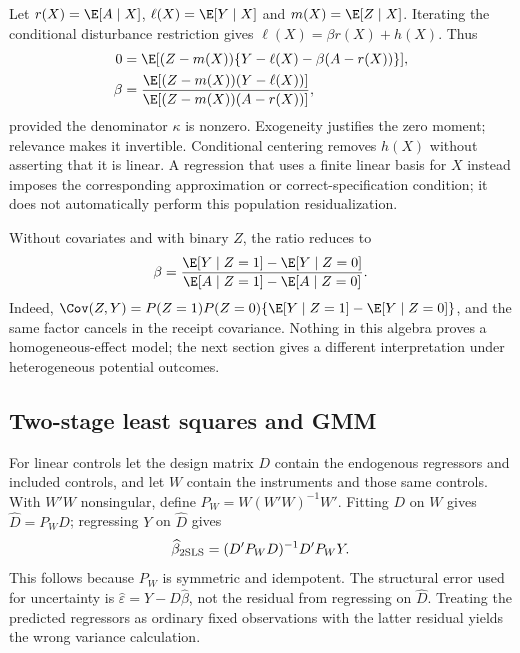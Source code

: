 Let $r(X)=\E[A\mid X]$, $\ell(X)=\E[Y\mid X]$ and
$m(X)=\E[Z\mid X]$. Iterating the conditional disturbance restriction
gives $\ell(X)=\beta r(X)+h(X)$. Thus
\begin{align}
 0&=\E[(Z-m(X))\{Y-\ell(X)-\beta(A-r(X))\}],\nonumber\\
 \beta&=\frac{\E[(Z-m(X))(Y-\ell(X))]}
                   {\E[(Z-m(X))(A-r(X))]},
 \label{r3:residual-iv}
\end{align}
provided the denominator $\kappa$ is nonzero. Exogeneity justifies the
zero moment; relevance makes it invertible. Conditional centering removes
$h(X)$ without asserting that it is linear. A regression that uses a
finite linear basis for $X$ instead imposes the corresponding approximation
or correct-specification condition; it does not automatically perform
this population residualization.

Without covariates and with binary $Z$, the ratio reduces to
\begin{equation}
 \beta=\frac{\E[Y\mid Z=1]-\E[Y\mid Z=0]}
                   {\E[A\mid Z=1]-\E[A\mid Z=0]}.
 \label{r3:wald}
\end{equation}
Indeed, $\Cov(Z,Y)=P(Z=1)P(Z=0)\{\E[Y\mid Z=1]-\E[Y\mid Z=0]\}$,
and the same factor cancels in the receipt covariance. Nothing in this
algebra proves a homogeneous-effect model; the next section gives a
different interpretation under heterogeneous potential outcomes.

\subsection{Two-stage least squares and GMM}
For linear controls let the design matrix $D$ contain the endogenous
regressors and included controls, and let $W$ contain the instruments and
those same controls. With $W'W$ nonsingular, define
$P_W=W(W'W)^{-1}W'$. Fitting $D$ on $W$ gives $\widehat D=P_WD$;
regressing $Y$ on $\widehat D$ gives
\begin{equation}
 \widehat\beta_{\rm 2SLS}=(D'P_WD)^{-1}D'P_WY.
 \label{r3:2sls}
\end{equation}
This follows because $P_W$ is symmetric and idempotent. The structural
error used for uncertainty is $\widehat\varepsilon=Y-D\widehat\beta$,
not the residual from regressing on $\widehat D$. Treating the predicted
regressors as ordinary fixed observations with the latter residual yields
the wrong variance calculation.

